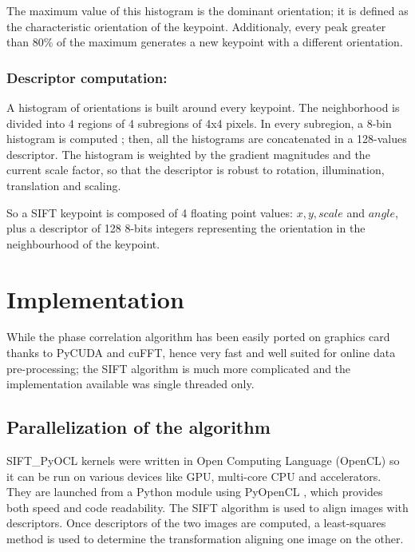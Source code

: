 \documentclass[preprint]{iucr}
\begin{document}
The maximum value of this histogram is the dominant orientation; it is defined
as the characteristic orientation of the keypoint. 
Additionaly, every peak greater than 80\% of the maximum generates a new
keypoint with a different orientation. 



\subsubsection{Descriptor computation:}
A histogram of orientations is built around every keypoint. 
The neighborhood is divided into 4 regions of 4 subregions of 4x4 pixels. 
In every subregion, a 8-bin histogram is computed ; then, all the histograms are
concatenated in a 128-values descriptor. 
The histogram is weighted by the gradient magnitudes and the current scale
factor, so that the descriptor is robust to rotation, illumination, translation
and scaling.  

So a SIFT keypoint is composed of 4 floating point values: $x, y, scale$ and
$angle$, plus a descriptor of 128 8-bits integers representing the
orientation in the neighbourhood of the keypoint.

\section{Implementation}
While the phase correlation algorithm has been easily ported on graphics card
thanks to PyCUDA \cite{pyopencl} and cuFFT, hence very fast and well suited for
online data pre-processing;
the SIFT algorithm is much more complicated and the implementation available was
single threaded only.


\subsection{Parallelization of the algorithm}
SIFT\_PyOCL kernels were written in Open Computing Language \cite{opencl}
(OpenCL) so it can be run on various devices like GPU, multi-core CPU and
accelerators. 
They are launched from a Python module using PyOpenCL \cite{pyopencl},  which
provides both speed and code readability. 
The SIFT algorithm is used to align images with descriptors. 
Once descriptors of the two images are computed, a least-squares method is used
to determine the transformation aligning one image on the other.
\end{document}
